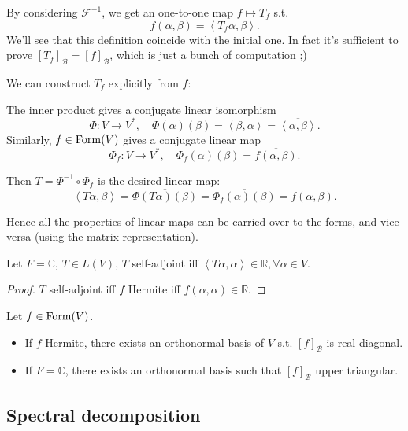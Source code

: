 By considering $\mathcal{F}^{-1}$, we get an one-to-one map $f\mapsto T_f$ s.t.
\[
f(\alpha, \beta) = \left<T_f\alpha, \beta \right>.
\]
We'll see that this definition coincide with the initial one.
In fact it's sufficient to prove $[T_f]_{\mathcal{B}} = [f]_{\mathcal{B}}$,
which is just a bunch of computation ;)

\begin{remark}
    We can construct $T_f$ explicitly from $f$:

	The inner product gives a conjugate linear isomorphism
	\[
		\Phi: V\to V^*, \quad \Phi(\alpha)(\beta) = \left<\beta, \alpha\right>
		= \overline{\left<\alpha, \beta \right>}.
	\]
	Similarly, $f\in \operatorname{Form}(V)$ gives a conjugate linear map
	\[
		\Phi_f: V\to V^*, \quad \Phi_f(\alpha)(\beta) =
		\overline{f(\alpha, \beta)}.
	\]

	Then $T = \Phi^{-1} \circ \Phi_f$ is the desired linear map:
	\[
	\left<T\alpha, \beta \right> = \overline{\Phi(T\alpha)(\beta)}
	= \overline{\Phi_f(\alpha)(\beta)} = f(\alpha, \beta).
	\]
\end{remark}

Hence all the properties of linear maps can be carried over to the forms,
and vice versa (using the matrix representation).

\begin{corollary}
    Let $F = \mathbb{C}$, $T\in L(V)$, $T$ self-adjoint iff
	$\left<T\alpha, \alpha\right>\in \mathbb{R}, \forall \alpha\in V$.
\end{corollary}
\begin{proof}[Proof]
    $T$ self-adjoint iff $f$ Hermite iff $f(\alpha, \alpha) \in \mathbb{R}$.
\end{proof}

\begin{corollary}
	Let $f\in \operatorname{Form}(V)$.
	\begin{itemize}
		\item If $f$ Hermite, there exists an orthonormal basis of $V$ s.t.
			$[f]_{\mathcal{B}}$ is real diagonal.
		\item If $F = \mathbb{C}$, there exists an orthonormal basis
			such that $[f]_{\mathcal{B}}$ upper triangular.
	\end{itemize}
\end{corollary}

\subsection{Spectral decomposition}
\label{sub:Spectral decomposition}

